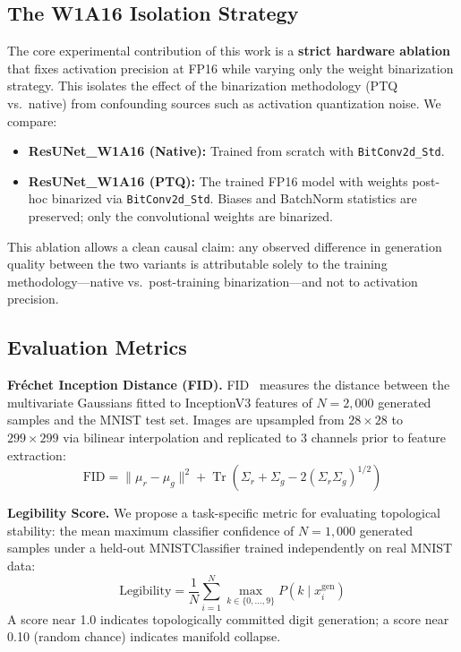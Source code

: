 \documentclass[conference]{IEEEtran}
\begin{document}
\subsection{The W1A16 Isolation Strategy}

The core experimental contribution of this work is a \textbf{strict hardware ablation}
that fixes activation precision at FP16 while varying only the weight binarization
strategy. This isolates the effect of the binarization methodology (PTQ vs.\ native)
from confounding sources such as activation quantization noise. We compare:

\begin{itemize}
  \item \textbf{ResUNet\_W1A16 (Native):} Trained from scratch with
    \texttt{BitConv2d\_Std}.
  \item \textbf{ResUNet\_W1A16 (PTQ):} The trained FP16 model with weights post-hoc
    binarized via \texttt{BitConv2d\_Std}. Biases and BatchNorm statistics are
    preserved; only the convolutional weights are binarized.
\end{itemize}

This ablation allows a clean causal claim: any observed difference in generation quality
between the two variants is attributable solely to the training methodology---native
vs.\ post-training binarization---and not to activation precision.

\subsection{Evaluation Metrics}

\textbf{Fr\'echet Inception Distance (FID).} FID~\cite{heusel2017fid} measures the
distance between the multivariate Gaussians fitted to InceptionV3 features of
$N=2{,}000$ generated samples and the MNIST test set. Images are upsampled from
$28{\times}28$ to $299{\times}299$ via bilinear interpolation and replicated to 3
channels prior to feature extraction:
\begin{equation}
  \text{FID} = \|\mu_r - \mu_g\|^2 +
  \operatorname{Tr}\!\left(\Sigma_r + \Sigma_g -
  2(\Sigma_r\Sigma_g)^{1/2}\right)
  \label{eq:fid}
\end{equation}

\textbf{Legibility Score.} We propose a task-specific metric for evaluating topological
stability: the mean maximum classifier confidence of $N=1{,}000$ generated samples under
a held-out MNISTClassifier trained independently on real MNIST data:
\begin{equation}
  \text{Legibility} = \frac{1}{N}\sum_{i=1}^{N}
  \max_{k\in\{0,\ldots,9\}} P\!\left(k \mid x_i^{\text{gen}}\right)
  \label{eq:legibility}
\end{equation}
A score near 1.0 indicates topologically committed digit generation; a score near 0.10
(random chance) indicates manifold collapse.
\end{document}
